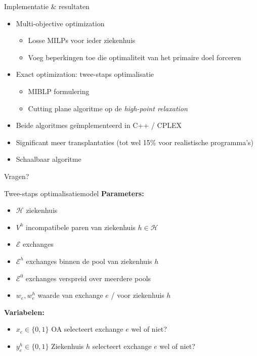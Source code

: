 \documentclass{beamer}
\newcommand{\hospitals}{\mathcal{H}}
\newcommand{\exchanges}{\mathcal{E}}
\begin{document}
\begin{frame}{Implementatie \& resultaten}
	\begin{itemize}
		\setlength\itemsep{1em}
		\item Multi-objective optimization
		\begin{itemize}
			\item Losse MILPs voor ieder ziekenhuis
			\item Voeg beperkingen toe die optimaliteit van het primaire doel forceren
		\end{itemize}
		\item Exact optimization: twee-staps optimalisatie
		\begin{itemize}
			\item MIBLP formulering
			\item Cutting plane algoritme op de \emph{high-point relaxation}
		\end{itemize}
		\item Beide algoritmes ge\"implementeerd in C++ / CPLEX
		\item Significant meer transplantaties (tot wel 15\% voor realistische programma's)
		\item Schaalbaar algoritme
	\end{itemize}
\end{frame}

\begin{frame}
    \Huge\centering Vragen? 
\end{frame}

\begin{frame}{Twee-staps optimalisatiemodel}
	\textbf{Parameters:}
	\begin{itemize}
		\item $\hospitals$ \hfill ziekenhuis
		\item $V^{h}$ \hfill incompatibele paren van ziekenhuis $h \in \hospitals$
		\item $\exchanges$ \hfill exchanges
		\item $\exchanges^{h}$ \hfill exchanges binnen de pool van ziekenhuis $h$
		\item $\exchanges^{0}$ \hfill exchanges verspreid over meerdere pools
		\item $w_{e}, w_{e}^{h}$ \hfill waarde van exchange $e$ / voor ziekenhuis $h$
	\end{itemize}
	\vspace{1cm}
	\textbf{Variabelen:}
	\begin{itemize}
		\item $x_{e} \in \{0,1\}$ \hfill OA selecteert exchange $e$ wel of niet?
		\item $y_{e}^{h} \in \{0,1\}$ \hfill Ziekenhuis $h$ selecteert exchange $e$ wel of niet?
	\end{itemize}
\end{frame}
\end{document}
